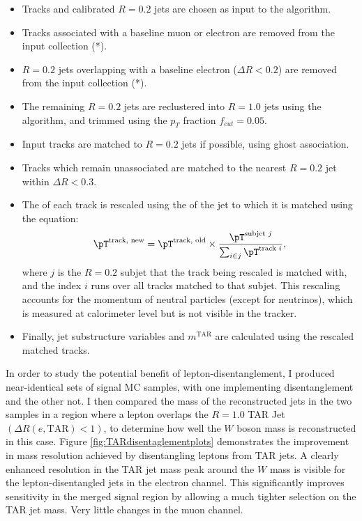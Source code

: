 \begin{itemize}
  \item Tracks and calibrated \akt $R=0.2$ jets are chosen as input to the algorithm.
  \item Tracks associated with a baseline muon or electron are removed from the input collection (*).
  \item \akt $R=0.2$ jets overlapping with a baseline electron ($\Delta R<0.2$) are removed from the input collection (*).
  \item The remaining \akt $R=0.2$ jets are reclustered into $R=1.0$ jets using the \akt algorithm, and trimmed using the $p_T$ fraction \(f_{cut}=0.05\).
  \item Input tracks are matched to $R=0.2$ jets if possible, using ghost association.
  \item Tracks which remain unassociated are matched to the nearest \akt $R=0.2$ jet within $\Delta R<0.3$.
  \item The \pT of each track is rescaled using the \pT of the jet to which it is matched using the equation:
  \begin{equation}
  \pT^{\text{track, new}} = \pT^{\text{track, old}}\times \frac{\pT^{\text{subjet $j$}}}{\sum_{i \in j} \pT^{\text{track $i$}}} ,
  \label{eq:TAR_rescale}
  \end{equation}  where $j$ is the $R=0.2$ subjet that the track being rescaled is matched with, and the index $i$ runs over all tracks matched to that subjet. This rescaling accounts for the momentum of neutral particles (except for neutrinos), which is measured at calorimeter level but is not visible in the tracker.
  \item Finally, jet substructure variables and  $m^\text{TAR}$ are calculated using the rescaled matched tracks.
\end{itemize}

In order to study the potential benefit of lepton-disentanglement, I produced near-identical sets of signal MC samples, with one implementing disentanglement and the other not.
I then compared the mass of the reconstructed jets in the two samples in a region where a lepton overlaps the $R=1.0$ TAR Jet $(\Delta R(e, \text{TAR}) < 1)$, to determine how well the $W$ boson mass is reconstructed in this case.
Figure \ref{fig:TARdisentaglementplots} demonstrates the improvement in mass resolution achieved by disentangling leptons from TAR jets. A clearly enhanced resolution in the TAR jet mass peak around the $W$ mass is visible for the lepton-disentangled jets in the electron channel. This significantly improves sensitivity in the merged signal region by allowing a much tighter selection on the TAR jet mass. Very little changes in the muon channel.

